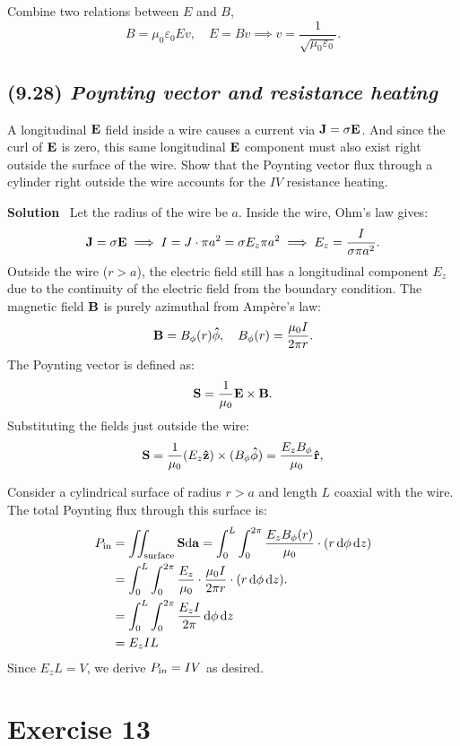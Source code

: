 \documentclass[hidelinks]{article}
\begin{document}
Combine two relations between $E$ and $B$,
$$B=\mu_0\varepsilon_0 Ev, \quad E=Bv \implies v= \frac{1}{\sqrt{\mu_0\varepsilon_0}}.$$

\subsection{(9.28) \textit{Poynting vector and resistance heating}}
A longitudinal $\vb{E}$ field inside a wire causes a current via $\vb{J}=\sigma \vb{E}$. And since the curl of $\vb{E}$ is zero, this same longitudinal $\vb{E}$ component must also exist right outside the surface of the wire. Show that the Poynting vector flux through a cylinder right outside the wire accounts for the $IV$ resistance heating.

\vspace{5mm}
\noindent
\textbf{Solution} \, Let the radius of the wire be $a$. Inside the wire, Ohm’s law gives:
$$ \vb{J} = \sigma \vb{E} \implies I = J \cdot \pi a^2 = \sigma E_z \pi a^2 \implies  E_z = \frac{I}{\sigma \pi a^2}. $$
Outside the wire ($r > a$), the electric field still has a longitudinal component $E_z$ due to the continuity of the electric field from the boundary condition. The magnetic field $\vb{B}$ is purely azimuthal from Ampère’s law:
$$\vb{B} = B_\phi(r)\vu{\phi}, \quad B_\phi(r) = \frac{\mu_0 I}{2\pi r}.$$
The Poynting vector is defined as:
$$\vb{S} = \frac{1}{\mu_0} \vb{E} \times \vb{B}.$$
Substituting the fields just outside the wire:
$$\vb{S} = \frac{1}{\mu_0} (E_z \vu{z}) \times (B_\phi \vu{\phi}) = \frac{E_z B_\phi}{\mu_0} \vu{r},$$

Consider a cylindrical surface of radius $r > a$ and length $L$ coaxial with the wire. The total Poynting flux through this surface is:
\begin{align*}
    P_{\text{in}} &= \iint_{\text{surface}} \vb{S} \mathrm{d}\vb{a} = \int_0^L \int_0^{2\pi} \frac{E_z B_\phi(r)}{\mu_0} \cdot (r\, \mathrm{d}\phi\, \mathrm{d}z)\\
    &= \int_0^L \int_0^{2\pi} \frac{E_z }{\mu_0} \cdot \frac{\mu_0I}{2\pi r} \cdot (r\, \mathrm{d}\phi\, \mathrm{d}z).\\
    &= \int_0^L \int_0^{2\pi} \frac{E_z I}{2\pi} \, \mathrm{d}\phi\, \mathrm{d}z \\
    &=E_zIL 
\end{align*}
Since $E_zL =V$, we derive $P_{\text in} = IV$ as desired.

\pagebreak

\section{Exercise 13}
\end{document}
